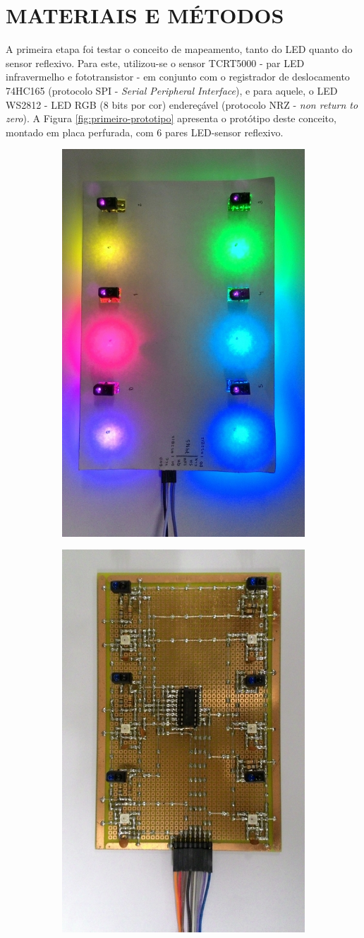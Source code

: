 \documentclass[a4paper,12pt]{article}
\begin{document}
    
  \clearpage
  \section{MATERIAIS E MÉTODOS}
  
  A primeira etapa foi testar o conceito de mapeamento, tanto do LED quanto do sensor reflexivo. Para este, utilizou-se o sensor TCRT5000 - par LED infravermelho e fototransistor - em conjunto com o registrador de deslocamento 74HC165 (protocolo SPI - \emph{Serial Peripheral Interface}), e para aquele, o LED WS2812 - LED RGB (8 bits por cor) endereçável (protocolo NRZ - \emph{non return to zero}). A Figura \ref{fig:primeiro-prototipo} apresenta o protótipo deste conceito, montado em placa perfurada, com 6 pares LED-sensor reflexivo.
  
  \begin{figure}[!h]
    \caption{Primeiro protótipo - teste do conceito}
    \label{fig:primeiro-prototipo}
      \begin{subfigure}
        \centering
        \includegraphics[width=.4\linewidth]{img/p-proto-luz.jpg}
      \end{subfigure}
      \begin{subfigure}
        \centering
        \includegraphics[width=.4\linewidth]{img/p-proto-circ.jpg}
      \end{subfigure}    
  \end{figure}
  
\end{document}
